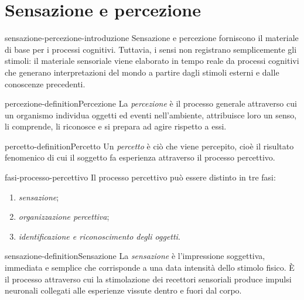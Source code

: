 \documentclass[preview]{standalone}
\begin{document}
\genpage

\section{Sensazione e percezione}

\begin{snippet}{sensazione-percezione-introduzione}
    Sensazione e percezione forniscono il materiale di base per i processi
    cognitivi. Tuttavia, i sensi non registrano semplicemente gli stimoli: il
    materiale sensoriale viene elaborato in tempo reale da processi cognitivi
    che generano interpretazioni del mondo a partire dagli stimoli esterni e
    dalle conoscenze precedenti.
\end{snippet}

\begin{snippetdefinition}{percezione-definition}{Percezione}
    La \emph{percezione} è il processo generale attraverso cui un organismo
    individua oggetti ed eventi nell'ambiente, attribuisce loro un senso, li
    comprende, li riconosce e si prepara ad agire rispetto a essi.
\end{snippetdefinition}

\begin{snippetdefinition}{percetto-definition}{Percetto}
    Un \emph{percetto} è ciò che viene percepito, cioè il risultato fenomenico
    di cui il soggetto fa esperienza attraverso il processo percettivo.
\end{snippetdefinition}

\begin{snippet}{fasi-processo-percettivo}
    Il processo percettivo può essere distinto in tre fasi:
    \begin{enumerate}
        \item \emph{sensazione};
        \item \emph{organizzazione percettiva};
        \item \emph{identificazione e riconoscimento degli oggetti}.
    \end{enumerate}
\end{snippet}


\begin{snippetdefinition}{sensazione-definition}{Sensazione}
    La \emph{sensazione} è l'impressione soggettiva, immediata e semplice che
    corrisponde a una data intensità dello stimolo fisico. È il processo
    attraverso cui la stimolazione dei recettori sensoriali produce impulsi
    neuronali collegati alle esperienze vissute dentro e fuori dal corpo.
\end{snippetdefinition}
\end{document}
